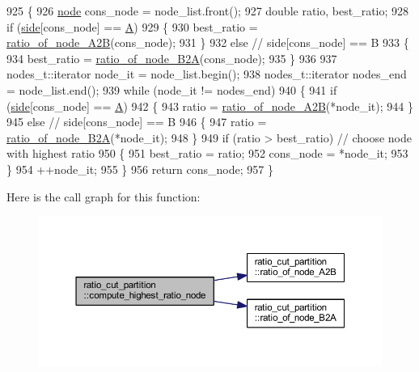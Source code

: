 \begin{DoxyCode}
925 \{
926     \mbox{\hyperlink{classnode}{node}} cons\_node = node\_list.front();
927     \textcolor{keywordtype}{double} ratio, best\_ratio;
928     \textcolor{keywordflow}{if} (\mbox{\hyperlink{classratio__cut__partition_a2bf913d1d8607747885177a3b585e611}{side}}[cons\_node] == \mbox{\hyperlink{classratio__cut__partition_a9c0da5ad845b01bddbc1f238fa35cdd0}{A}})
929     \{
930     best\_ratio = \mbox{\hyperlink{classratio__cut__partition_add7d355bd4df2cf6fa77ddc791692c88}{ratio\_of\_node\_A2B}}(cons\_node);
931     \}
932     \textcolor{keywordflow}{else}    \textcolor{comment}{// side[cons\_node] == B}
933     \{
934     best\_ratio = \mbox{\hyperlink{classratio__cut__partition_a094de379f453978db56695d53f6bc536}{ratio\_of\_node\_B2A}}(cons\_node);
935     \}
936     
937     nodes\_t::iterator node\_it = node\_list.begin();
938     nodes\_t::iterator nodes\_end = node\_list.end();
939     \textcolor{keywordflow}{while} (node\_it != nodes\_end)
940     \{
941     \textcolor{keywordflow}{if} (\mbox{\hyperlink{classratio__cut__partition_a2bf913d1d8607747885177a3b585e611}{side}}[cons\_node] == \mbox{\hyperlink{classratio__cut__partition_a9c0da5ad845b01bddbc1f238fa35cdd0}{A}})
942     \{
943         ratio = \mbox{\hyperlink{classratio__cut__partition_add7d355bd4df2cf6fa77ddc791692c88}{ratio\_of\_node\_A2B}}(*node\_it);
944     \}
945     \textcolor{keywordflow}{else}    \textcolor{comment}{// side[cons\_node] == B}
946     \{
947         ratio = \mbox{\hyperlink{classratio__cut__partition_a094de379f453978db56695d53f6bc536}{ratio\_of\_node\_B2A}}(*node\_it);
948     \}
949     \textcolor{keywordflow}{if} (ratio > best\_ratio) \textcolor{comment}{// choose node with highest ratio}
950     \{
951         best\_ratio = ratio;
952         cons\_node = *node\_it;
953     \}
954     ++node\_it;
955     \}
956     \textcolor{keywordflow}{return} cons\_node;
957 \}
\end{DoxyCode}
Here is the call graph for this function\+:\nopagebreak
\begin{figure}[H]
\begin{center}
\leavevmode
\includegraphics[width=350pt]{classratio__cut__partition_a11bd0644238997c99e7035507c709e50_cgraph}
\end{center}
\end{figure}
